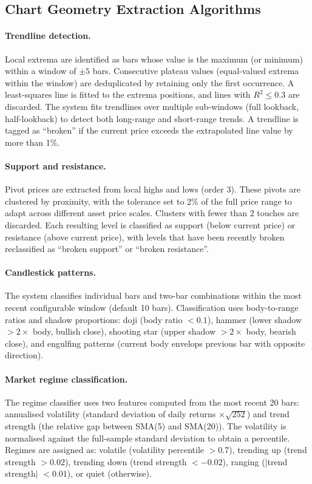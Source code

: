 \subsection{Chart Geometry Extraction Algorithms}
\label{app:geometry}

\paragraph{Trendline detection.}
Local extrema are identified as bars whose value is the maximum (or minimum) within a window of $\pm 5$ bars. Consecutive plateau values (equal-valued extrema within the window) are deduplicated by retaining only the first occurrence. A least-squares line is fitted to the extrema positions, and lines with $R^2 \leq 0.3$ are discarded. The system fits trendlines over multiple sub-windows (full lookback, half-lookback) to detect both long-range and short-range trends. A trendline is tagged as ``broken'' if the current price exceeds the extrapolated line value by more than 1\%.

\paragraph{Support and resistance.}
Pivot prices are extracted from local highs and lows (order 3). These pivots are clustered by proximity, with the tolerance set to 2\% of the full price range to adapt across different asset price scales. Clusters with fewer than 2 touches are discarded. Each resulting level is classified as support (below current price) or resistance (above current price), with levels that have been recently broken reclassified as ``broken support'' or ``broken resistance''.

\paragraph{Candlestick patterns.}
The system classifies individual bars and two-bar combinations within the most recent configurable window (default 10 bars). Classification uses body-to-range ratios and shadow proportions: doji (body ratio $< 0.1$), hammer (lower shadow $> 2 \times$ body, bullish close), shooting star (upper shadow $> 2 \times$ body, bearish close), and engulfing patterns (current body envelops previous bar with opposite direction).

\paragraph{Market regime classification.}
The regime classifier uses two features computed from the most recent 20 bars: annualised volatility (standard deviation of daily returns $\times \sqrt{252}$) and trend strength (the relative gap between SMA(5) and SMA(20)). The volatility is normalised against the full-sample standard deviation to obtain a percentile. Regimes are assigned as: volatile (volatility percentile $> 0.7$), trending up (trend strength $> 0.02$), trending down (trend strength $< -0.02$), ranging ($|$trend strength$|$ $< 0.01$), or quiet (otherwise).

